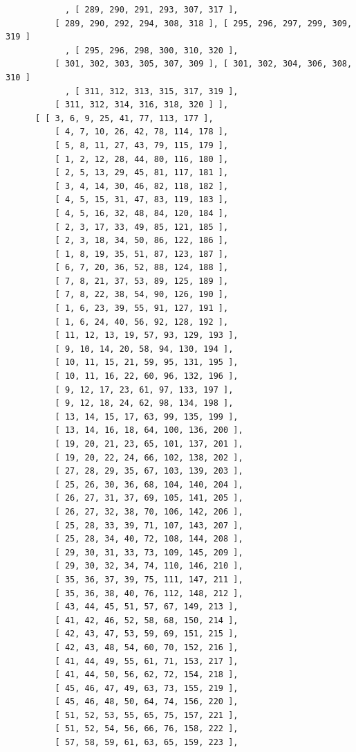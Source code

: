 \documentclass{article}
\begin{document}
\begin{verbatim}
            , [ 289, 290, 291, 293, 307, 317 ], 
          [ 289, 290, 292, 294, 308, 318 ], [ 295, 296, 297, 299, 309, 319 ]
            , [ 295, 296, 298, 300, 310, 320 ], 
          [ 301, 302, 303, 305, 307, 309 ], [ 301, 302, 304, 306, 308, 310 ]
            , [ 311, 312, 313, 315, 317, 319 ], 
          [ 311, 312, 314, 316, 318, 320 ] ], 
      [ [ 3, 6, 9, 25, 41, 77, 113, 177 ], 
          [ 4, 7, 10, 26, 42, 78, 114, 178 ], 
          [ 5, 8, 11, 27, 43, 79, 115, 179 ], 
          [ 1, 2, 12, 28, 44, 80, 116, 180 ], 
          [ 2, 5, 13, 29, 45, 81, 117, 181 ], 
          [ 3, 4, 14, 30, 46, 82, 118, 182 ], 
          [ 4, 5, 15, 31, 47, 83, 119, 183 ], 
          [ 4, 5, 16, 32, 48, 84, 120, 184 ], 
          [ 2, 3, 17, 33, 49, 85, 121, 185 ], 
          [ 2, 3, 18, 34, 50, 86, 122, 186 ], 
          [ 1, 8, 19, 35, 51, 87, 123, 187 ], 
          [ 6, 7, 20, 36, 52, 88, 124, 188 ], 
          [ 7, 8, 21, 37, 53, 89, 125, 189 ], 
          [ 7, 8, 22, 38, 54, 90, 126, 190 ], 
          [ 1, 6, 23, 39, 55, 91, 127, 191 ], 
          [ 1, 6, 24, 40, 56, 92, 128, 192 ], 
          [ 11, 12, 13, 19, 57, 93, 129, 193 ], 
          [ 9, 10, 14, 20, 58, 94, 130, 194 ], 
          [ 10, 11, 15, 21, 59, 95, 131, 195 ], 
          [ 10, 11, 16, 22, 60, 96, 132, 196 ], 
          [ 9, 12, 17, 23, 61, 97, 133, 197 ], 
          [ 9, 12, 18, 24, 62, 98, 134, 198 ], 
          [ 13, 14, 15, 17, 63, 99, 135, 199 ], 
          [ 13, 14, 16, 18, 64, 100, 136, 200 ], 
          [ 19, 20, 21, 23, 65, 101, 137, 201 ], 
          [ 19, 20, 22, 24, 66, 102, 138, 202 ], 
          [ 27, 28, 29, 35, 67, 103, 139, 203 ], 
          [ 25, 26, 30, 36, 68, 104, 140, 204 ], 
          [ 26, 27, 31, 37, 69, 105, 141, 205 ], 
          [ 26, 27, 32, 38, 70, 106, 142, 206 ], 
          [ 25, 28, 33, 39, 71, 107, 143, 207 ], 
          [ 25, 28, 34, 40, 72, 108, 144, 208 ], 
          [ 29, 30, 31, 33, 73, 109, 145, 209 ], 
          [ 29, 30, 32, 34, 74, 110, 146, 210 ], 
          [ 35, 36, 37, 39, 75, 111, 147, 211 ], 
          [ 35, 36, 38, 40, 76, 112, 148, 212 ], 
          [ 43, 44, 45, 51, 57, 67, 149, 213 ], 
          [ 41, 42, 46, 52, 58, 68, 150, 214 ], 
          [ 42, 43, 47, 53, 59, 69, 151, 215 ], 
          [ 42, 43, 48, 54, 60, 70, 152, 216 ], 
          [ 41, 44, 49, 55, 61, 71, 153, 217 ], 
          [ 41, 44, 50, 56, 62, 72, 154, 218 ], 
          [ 45, 46, 47, 49, 63, 73, 155, 219 ], 
          [ 45, 46, 48, 50, 64, 74, 156, 220 ], 
          [ 51, 52, 53, 55, 65, 75, 157, 221 ], 
          [ 51, 52, 54, 56, 66, 76, 158, 222 ], 
          [ 57, 58, 59, 61, 63, 65, 159, 223 ], 

\end{verbatim}
\end{document}
